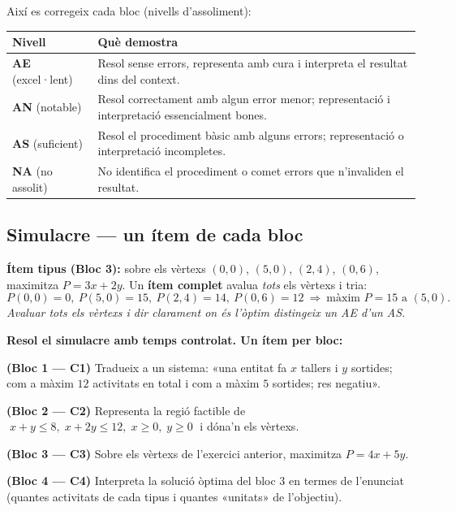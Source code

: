 \noindent Així es corregeix cada bloc (nivells d'assoliment):
\begin{center}
\renewcommand{\arraystretch}{1.3}
\begin{tabular}{p{2.4cm} p{10.2cm}}
\toprule
\textbf{Nivell} & \textbf{Què demostra} \\
\midrule
\textbf{AE} (excel·lent) & Resol sense errors, representa amb cura i interpreta el
resultat dins del context. \\
\textbf{AN} (notable) & Resol correctament amb algun error menor; representació i
interpretació essencialment bones. \\
\textbf{AS} (suficient) & Resol el procediment bàsic amb alguns errors; representació
o interpretació incompletes. \\
\textbf{NA} (no assolit) & No identifica el procediment o comet errors que
n'invaliden el resultat. \\
\bottomrule
\end{tabular}
\end{center}

\subsection{Simulacre — un ítem de cada bloc}

\begin{exemple}
\textbf{Ítem tipus (Bloc 3):} sobre els vèrtexs $(0,0)$, $(5,0)$, $(2,4)$, $(0,6)$,
maximitza $P=3x+2y$. Un \textbf{ítem complet} avalua \emph{tots} els vèrtexs i tria:
\[
P(0,0)=0,\ P(5,0)=15,\ P(2,4)=14,\ P(0,6)=12 \ \Rightarrow\ \text{màxim } P=15 \text{ a } (5,0).
\]
\emph{Avaluar tots els vèrtexs i dir clarament on és l'òptim distingeix un AE d'un AS.}
\end{exemple}

\begin{exercicis}
\textbf{Resol el simulacre amb temps controlat. Un ítem per bloc:}
\begin{exlist}
  \item \textbf{(Bloc 1 — C1)} Tradueix a un sistema: «una entitat fa $x$ tallers i $y$
        sortides; com a màxim $12$ activitats en total i com a màxim $5$ sortides; res
        negatiu».
  \item \textbf{(Bloc 2 — C2)} Representa la regió factible de
        $\;x+y\le 8,\;x+2y\le 12,\;x\ge 0,\;y\ge 0\;$ i dóna'n els vèrtexs.
  \item \textbf{(Bloc 3 — C3)} Sobre els vèrtexs de l'exercici anterior, maximitza
        $P=4x+5y$.
  \item \textbf{(Bloc 4 — C4)} Interpreta la solució òptima del bloc 3 en termes de
        l'enunciat (quantes activitats de cada tipus i quantes «unitats» de l'objectiu).
\end{exlist}
\end{exercicis}


